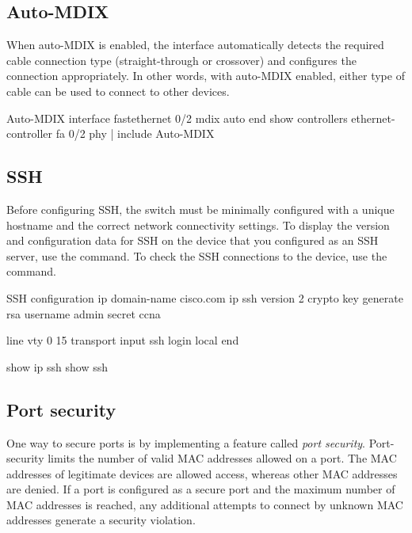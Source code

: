 \subsection{Auto-MDIX}

When auto-MDIX is enabled, the interface automatically detects the required cable connection type (straight-through or crossover) and configures the connection appropriately. In other words, with auto-MDIX enabled, either type of cable can be used to connect to other devices.

\begin{sexylisting}{Auto-MDIX}
interface fastethernet 0/2
  mdix auto
  end
show controllers ethernet-controller fa 0/2 phy | include Auto-MDIX  
\end{sexylisting}

\subsection{SSH}

Before configuring SSH, the switch must be minimally configured with a unique hostname and the correct network connectivity settings. To display the version and configuration data for SSH on the device that you configured as an SSH server, use the  command. To check the SSH connections to the device, use the  command.

\begin{sexylisting}{SSH configuration}
ip domain-name cisco.com
ip ssh version 2
crypto key generate rsa
username admin secret ccna

line vty 0 15
  transport input ssh
  login local
end

show ip ssh
show ssh  
\end{sexylisting}

\subsection{Port security}

One way to secure ports is by implementing a feature called \emph{port security}. Port-security limits the number of valid MAC addresses allowed on a port. The MAC addresses of legitimate devices are allowed access, whereas other MAC addresses are denied. If a port is configured as a secure port and the maximum number of MAC addresses is reached, any additional attempts to connect by unknown MAC addresses generate a security violation.\\

